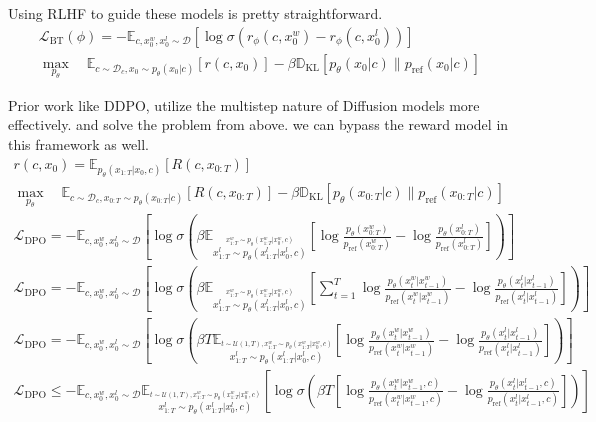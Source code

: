\documentclass[10pt]{article}
\begin{document}
Using RLHF to guide these models is pretty straightforward.
\begin{gather}
	\mathcal{L}_\text{BT}(\phi)=-\mathbb{E}_{c,x_0^w,x_0^l\sim\mathcal{D}}\left[\log\sigma\left(r_\phi(c,x_0^w)-r_\phi(c,x_0^l)\right)\right]\label{eq:bt_loss}\\
	\max_{p_\theta}\quad\mathbb{E}_{c\sim \mathcal{D}_c,x_0\sim p_\theta(x_0|c)}\left[r(c,x_0)\right]-\beta\mathbb{D}_\text{KL}\left[p_\theta(x_0|c)\|p_\text{ref}(x_0|c)\right]
\end{gather}

Prior work like DDPO, utilize the multistep nature of Diffusion models more effectively. and solve the problem from above. we can bypass the reward model in this framework as well.
\begin{gather}
	r(c,x_0)=\mathbb{E}_{p_\theta(x_{1:T}|x_0,c)}[R(c,x_{0:T})]                                              \\ \max_{p_\theta}\quad\mathbb{E}_{c\sim \mathcal{D}_c,x_{0:T}\sim p_\theta(x_{0:T}|c)}\left[R(c,x_{0:T})\right]-\beta\mathbb{D}_\text{KL}\left[p_\theta(x_{0:T}|c)\|p_\text{ref}(x_{0:T}|c)\right] \\
	\mathcal{L}_\text{DPO}=-\mathbb{E}_{c,x_0^w,x_0^l\sim\mathcal{D}}\left[\log\sigma\left(\beta\mathbb{E}_{
			\stackrel{{x_{1:T}^w\sim p_\theta(x_{1:T}^w|x_0^w,c)}}{x_{1:T}^l\sim p_\theta(x_{1:T}^l|x_0^l,c)}}\left[\log\frac{p_\theta(x_{0:T}^w)}{p_\text{ref}(x_{0:T}^w)}-\log\frac{p_\theta(x_{0:T}^l)}{p_\text{ref}(x_{0:T}^l)}\right]\right)\right]\\
	\mathcal{L}_\text{DPO}=-\mathbb{E}_{c,x_0^w,x_0^l\sim\mathcal{D}}\left[\log\sigma\left(\beta\mathbb{E}_{
			\stackrel{{x_{1:T}^w\sim p_\theta(x_{1:T}^w|x_0^w,c)}}{x_{1:T}^l\sim p_\theta(x_{1:T}^l|x_0^l,c)}}\left[\sum_{t=1}^{T}\log\frac{p_\theta(x_{t}^w|x_{t-1}^w)}{p_\text{ref}(x_{t}^w|x_{t-1}^w)}-\log\frac{p_\theta(x_{t}^l|x_{t-1}^l)}{p_\text{ref}(x_{t}^l|x_{t-1}^l)}\right]\right)\right]\\
	\mathcal{L}_\text{DPO}=-\mathbb{E}_{c,x_0^w,x_0^l\sim\mathcal{D}}\left[\log\sigma\left(\beta T\mathbb{E}_{
			\stackrel{t\sim\mathcal{U}(1,T), {x_{1:T}^w\sim p_\theta(x_{1:T}^w|x_0^w,c)}}{x_{1:T}^l\sim p_\theta(x_{1:T}^l|x_0^l,c)}}\left[\log\frac{p_\theta(x_{t}^w|x_{t-1}^w)}{p_\text{ref}(x_{t}^w|x_{t-1}^w)}-\log\frac{p_\theta(x_{t}^l|x_{t-1}^l)}{p_\text{ref}(x_{t}^l|x_{t-1}^l)}\right]\right)\right]\\
	\mathcal{L}_\text{DPO}\leq-\mathbb{E}_{c,x_0^w,x_0^l\sim\mathcal{D}}\mathbb{E}_{
	\stackrel{t\sim\mathcal{U}(1,T), {x_{1:T}^w\sim p_\theta(x_{1:T}^w|x_0^w,c)}}{x_{1:T}^l\sim p_\theta(x_{1:T}^l|x_0^l,c)}}\left[\log\sigma\left(\beta T\left[\log\frac{p_\theta(x_{t}^w|x_{t-1}^w,c)}{p_\text{ref}(x_{t}^w|x_{t-1}^w,c)}-\log\frac{p_\theta(x_{t}^l|x_{t-1}^l,c)}{p_\text{ref}(x_{t}^l|x_{t-1}^l,c)}\right]\right)\right]\\

\end{gather}
\end{document}
